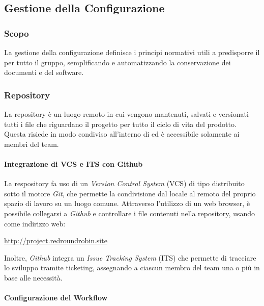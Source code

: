 \subsection{Gestione della Configurazione}


\subsubsection{Scopo}	

La gestione della configurazione definisce i principi normativi utili a predisporre il  per tutto il gruppo, semplificando e automatizzando la conservazione dei documenti e del software.

\subsubsection{Repository}

La repository è un luogo remoto in cui vengono mantenuti, salvati e versionati tutti i file che riguardano il progetto per tutto il ciclo di vita del prodotto. Questa risiede in modo condiviso all'interno di  ed è accessibile solamente ai membri del team.

	\paragraph{Integrazione di VCS e ITS con Github}

	La respository fa uso di un \textit{Version Control System} (VCS) di tipo distribuito sotto il motore \textit{Git}, che permette la condivisione dal locale al remoto del proprio spazio di lavoro su un luogo comune. Attraverso l'utilizzo di un web browser, è possibile collegarsi a \textit{Github} e controllare i file contenuti nella repository, usando come indirizzo web:

	\href{http://project.redroundrobin.site}{http://project.redroundrobin.site} 

	Inoltre, \textit{Github} integra un \textit{Issue Tracking System} (ITS) che permette di tracciare lo sviluppo tramite ticketing, assegnando a ciascun membro del team una o più  in base alle necessità.

	\paragraph{Configurazione del Workflow}

